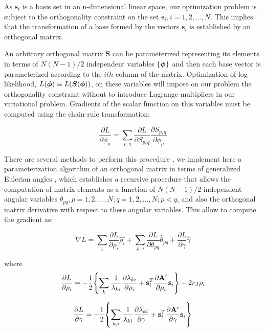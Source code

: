 \documentclass[reprint,amsmath,amssymb,superscriptaddress,showpacs,pre]{revtex4-1}
\let\originalleft\left
\let\originalright\right
\renewcommand{\left}{\mathopen{}\mathclose\bgroup\originalleft}
\renewcommand{\right}{\aftergroup\egroup\originalright}
\begin{document}
As $ \mathbf{s}_i$ is a basis set in an n-dimensional linear space,  our optimization problem is subject to the orthogonality constraint on the set $ \mathbf{s}_i,i=1,2,...,N$. This implies that the transformation of a base formed by the vectors $\mathbf{s}_i$ is established by an orthogonal matrix. 

An arbitrary orthogonal matrix $\bm S$ can be parameterized  representing its elements in terms of $N(N-1)/2$ independent variables $ \left\lbrace \bm \phi\right\rbrace $ and then each base vector is parameterized according to the $ith$ column of the  matrix. Optimization of log-likelihood,  $L(\boldmath{\bm \phi})\equiv L(\bm S(\boldmath{\bm \phi})) $, on these variables will impose on our problem the  orthogonality constraint without  to introduce Lagrange multipliers in our variational problem. Gradients of the scalar function on this variables  must be computed using the chain-rule transformation:

\begin{equation}
\frac{\partial L}{\partial \phi_\mu}=\sum_{p,q} \frac{\partial L}{\partial S_{p,q}}\frac{\partial S_{p,q}}{\partial \phi_\mu}
\end{equation}

There are several methods to perform this procedure \cite{Shepard_param_OM}, we implement here a parameterization algorithm of an orthogonal matrix in terms of generalized Eulerian angles \cite{Raffenetti1970GEA}, which establishes a recursive procedure that allows the computation of matrix elements as a function of $N(N-1)/2$  independent angular variables $\theta_ {pq}, p =1,2, ..., N; q =1,2, ..., N; p <q $, and also the orthogonal matrix derivative with respect to these angular variables. This allow to compute the gradient as:


\begin{equation}
\nabla L=\sum_i\frac{\partial L}{\partial \rho_i}\hat{\rho_i} +\sum_{p,q}\frac{\partial L}{\partial \theta_{pq}}  \hat{\theta}_{pq} +\frac{\partial L}{\partial \gamma}\hat{\gamma} 
\end{equation}

where 
\begin{equation}
\frac{\partial L}{\partial \rho_i} = -\frac{1}{2}\left\lbrace  \sum_k \frac{1}{\lambda_{ki}}\frac{\partial \lambda_{ki}}{\partial\rho_i} +\mathbf{s}_i^{T} \frac{\partial \mathbf{A}^{i} }{\partial\rho_i}\mathbf{s}_i \right\rbrace -2 r_{J} \rho_i
\end{equation}

\begin{equation}
\frac{\partial L}{\partial \gamma} = -\frac{1}{2}\left\lbrace  \sum_{k,i} \frac{1}{\lambda_{ki}}\frac{\partial \lambda_{ki}}{\partial\gamma} +\mathbf{s}_i^{T} \frac{\partial \mathbf{A}^{i} }{\partial\gamma}\mathbf{s}_i \right\rbrace 
\end{equation}
\end{document}
